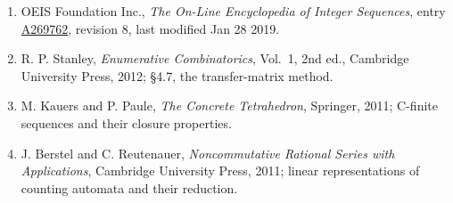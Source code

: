 \documentclass[11pt]{article}
\theoremstyle{definition}
\begin{document}
\begin{enumerate}

\item OEIS Foundation Inc., \emph{The On-Line Encyclopedia of Integer Sequences}, entry \href{https://oeis.org/A269762}{A269762}, revision 8, last modified Jan 28 2019.

\item R. P. Stanley, \emph{Enumerative Combinatorics}, Vol.~1, 2nd ed., Cambridge University Press, 2012; \S4.7, the transfer-matrix method.

\item M. Kauers and P. Paule, \emph{The Concrete Tetrahedron}, Springer, 2011; C-finite sequences and their closure properties.

\item J. Berstel and C. Reutenauer, \emph{Noncommutative Rational Series with Applications}, Cambridge University Press, 2011; linear representations of counting automata and their reduction.

\end{enumerate}
\end{document}
